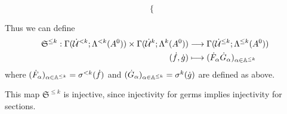 \begin{defn}
\begin{enumerate}
\[\begin{cases}
        \end{cases}
      \]
  \end{enumerate}
  Thus we can define
  \begin{align*}
    \mathfrak{S}^{\leq k}:
    \Gamma(\dot{\mathcal{U}}^{<k};\Lambda^{<k}(A^0))
    \times
    \Gamma(\dot{\mathcal{U}}^{k};\Lambda^{k}(A^0))
    &\longrightarrow
    \Gamma(\dot{\mathcal{U}}^{\leq k};\Lambda^{\leq k}(A^0))
  \\(\dot f, \dot g)
    &\longmapsto
    (\dot F_\alpha\dot G_\alpha)_{\alpha\in\mathbb{A}^{\leq k}}
  \end{align*}
  where $(\dot F_\alpha)_{\alpha\in\mathbb{A}^{\leq k}}=\sigma^{<k}(\dot f)$ and
  $(\dot G_\alpha)_{\alpha\in\mathbb{A}^{\leq k}}=\sigma^k(\dot g)$ are defined as
  above.
  \begin{s-rem}
    This map $\mathfrak{S}^{\leq k}$ is injective, since injectivity for germs
    implies injectivity for sections.
  \end{s-rem}
\end{defn}

